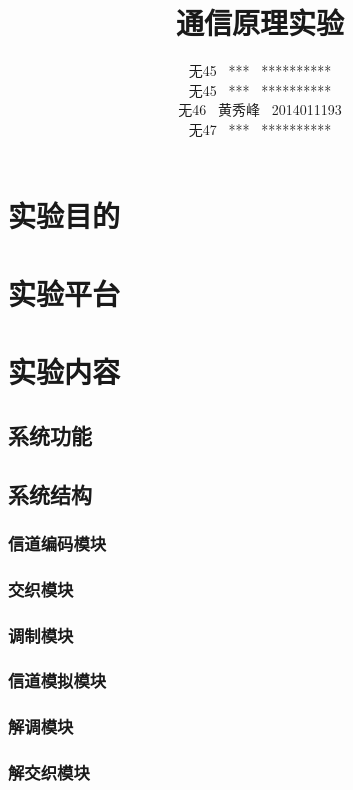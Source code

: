 \documentclass[UTF8]{ctexart}
\date{}
\title{\textbf{通信原理实验}}
\author{无45 \ *** \ **********\\
        无45 \ *** \ **********\\
        无46 \ 黄秀峰 \ 2014011193\\
        无47 \ *** \ **********}
\begin{document}
\maketitle

\section{实验目的}

\section{实验平台}

\section{实验内容}

\subsection{系统功能}

\subsection{系统结构}

\subsubsection{信道编码模块}


\subsubsection{交织模块}

\subsubsection{调制模块}

\subsubsection{信道模拟模块}

\subsubsection{解调模块}

\subsubsection{解交织模块}
\end{document}

